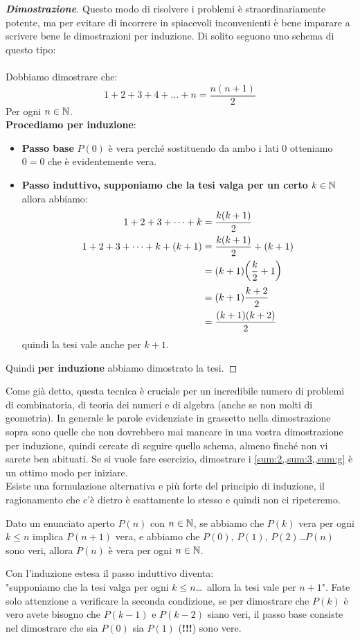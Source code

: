 \documentclass[11pt]{scrartcl}
\begin{document}
\begin{proof}[\textbf{Dimostrazione}]
		Questo modo di risolvere i problemi è straordinariamente potente, ma per evitare di incorrere in spiacevoli inconvenienti è bene imparare a scrivere bene le dimostrazioni per induzione. Di solito seguono uno schema di questo tipo:
		\\
		\\
		Dobbiamo dimostrare che:
		$$1+2+3+4+\dots+n=\frac{n(n+1)}{2}$$
		Per ogni $n\in\mathbb N$.\\
		\textbf{Procediamo per induzione}:
		\begin{itemize}
			\item \textbf{Passo base} $P(0)$ è vera perché sostituendo da ambo i lati $0$ otteniamo $0=0$ che è evidentemente vera.
			\item \textbf{Passo induttivo, supponiamo che la tesi valga per un certo $k\in\mathbb N$} allora abbiamo:
			\begin{equation}\notag
				\begin{split}
					1+2+3+\dots+k & = \frac{k(k+1)}{2} \\
					1+2+3+\dots+k+(k+1) & = \frac{k(k+1)}{2}+(k+1) \\
					& = (k+1)\bigg(\frac{k}{2}+1\bigg) \\
					& = (k+1)\frac{k+2}{2} \\
					& = \frac{(k+1)(k+2)}{2}
				\end{split}
			\end{equation}
			quindi la tesi vale anche per $k+1$.
		\end{itemize}
		Quindi \textbf{per induzione} abbiamo dimostrato la tesi.
	\end{proof}
	Come già detto, questa tecnica è cruciale per un incredibile numero di problemi di combinatoria, di teoria dei numeri e di algebra (anche se non molti di geometria). In generale le parole evidenziate in grassetto nella dimostrazione sopra sono quelle che non dovrebbero mai mancare in una vostra dimostrazione per induzione, quindi cercate di seguire quello schema, almeno finché non vi sarete ben abituati. Se si vuole fare esercizio, dimostrare i \cref{sum:2,,sum:3,,sum:g} è un ottimo modo per iniziare.
	\\
	Esiste una formulazione alternativa e più forte del principio di induzione, il ragionamento che c'è dietro è esattamente lo stesso e quindi non ci ripeteremo.
	\begin{proposition}
		Dato un enunciato aperto $P(n)$ con $n\in\mathbb N$, se abbiamo che $P(k)$ vera per ogni $k\le n$ implica $P(n+1)$ vera, e abbiamo che $P(0)$, $P(1)$, $P(2)$\dots $P(n)$ sono veri, allora $P(n)$ è vera per ogni $n\in\mathbb N$.
	\end{proposition}
	Con l'induzione estesa il passo induttivo diventa:\\
	"supponiamo che la tesi valga per ogni $k\le n$\dots \, allora la tesi vale per $n+1$". Fate solo attenzione a verificare la seconda condizione, se per dimostrare che $P(k)$ è vero avete bisogno che $P(k-1)$ e $P(k-2)$ siano veri, il passo base consiste nel dimostrare che sia $P(0)$ sia $P(1)$ (\textbf{!!!}) sono vere.
	
\end{document}
